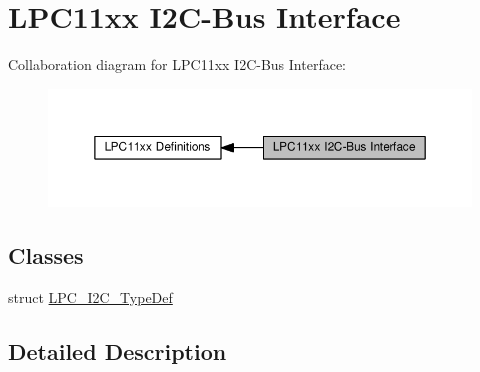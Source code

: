 \hypertarget{group___l_p_c11xx___i2_c}{}\section{L\+P\+C11xx I2\+C-\/\+Bus Interface}
\label{group___l_p_c11xx___i2_c}
Collaboration diagram for L\+P\+C11xx I2\+C-\/\+Bus Interface\+:\nopagebreak
\begin{figure}[H]
\begin{center}
\leavevmode
\includegraphics[width=350pt]{group___l_p_c11xx___i2_c}
\end{center}
\end{figure}
\subsection*{Classes}
\begin{DoxyCompactItemize}
\item 
struct \hyperlink{struct_l_p_c___i2_c___type_def}{L\+P\+C\+\_\+\+I2\+C\+\_\+\+Type\+Def}
\end{DoxyCompactItemize}


\subsection{Detailed Description}
